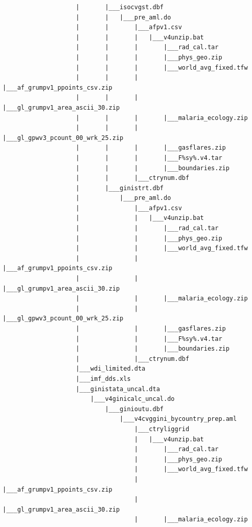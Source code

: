 \documentclass[
]{book}
\begin{document}
\begin{verbatim}
                    |       |___isocvgst.dbf
                    |       |   |___pre_aml.do
                    |       |       |___afpv1.csv
                    |       |       |   |___v4unzip.bat
                    |       |       |       |___rad_cal.tar
                    |       |       |       |___phys_geo.zip
                    |       |       |       |___world_avg_fixed.tfw
                    |       |       |       |___af_grumpv1_ppoints_csv.zip
                    |       |       |       |___gl_grumpv1_area_ascii_30.zip
                    |       |       |       |___malaria_ecology.zip
                    |       |       |       |___gl_gpwv3_pcount_00_wrk_25.zip
                    |       |       |       |___gasflares.zip
                    |       |       |       |___F%sy%.v4.tar
                    |       |       |       |___boundaries.zip
                    |       |       |___ctrynum.dbf
                    |       |___ginistrt.dbf
                    |           |___pre_aml.do
                    |               |___afpv1.csv
                    |               |   |___v4unzip.bat
                    |               |       |___rad_cal.tar
                    |               |       |___phys_geo.zip
                    |               |       |___world_avg_fixed.tfw
                    |               |       |___af_grumpv1_ppoints_csv.zip
                    |               |       |___gl_grumpv1_area_ascii_30.zip
                    |               |       |___malaria_ecology.zip
                    |               |       |___gl_gpwv3_pcount_00_wrk_25.zip
                    |               |       |___gasflares.zip
                    |               |       |___F%sy%.v4.tar
                    |               |       |___boundaries.zip
                    |               |___ctrynum.dbf
                    |___wdi_limited.dta
                    |___imf_dds.xls
                    |___ginistata_uncal.dta
                        |___v4ginicalc_uncal.do
                            |___ginioutu.dbf
                                |___v4cvggini_bycountry_prep.aml
                                    |___ctryliggrid
                                    |   |___v4unzip.bat
                                    |       |___rad_cal.tar
                                    |       |___phys_geo.zip
                                    |       |___world_avg_fixed.tfw
                                    |       |___af_grumpv1_ppoints_csv.zip
                                    |       |___gl_grumpv1_area_ascii_30.zip
                                    |       |___malaria_ecology.zip

\end{verbatim}
\end{document}
